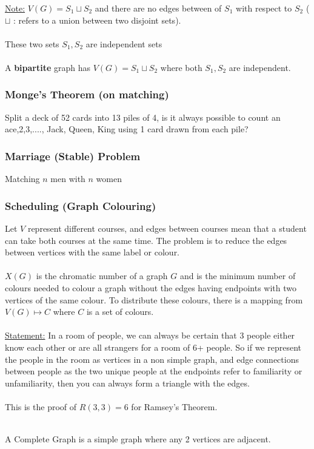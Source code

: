 \documentclass[12pt]{article}
\begin{document}
\underline{Note:} $V(G) = S_1 \sqcup S_2$ and there are no edges between of $S_1$ with respect to $S_2$ ($\sqcup$ : refers to a union between two disjoint sets).\\
\\
These two sets $S_1, S_2$ are independent sets\\
\\
A \textbf{bipartite} graph has $V(G) = S_1 \sqcup S_2$ where both $S_1, S_2$ are independent.

\subsubsection{Monge's Theorem (on matching)}

Split a deck of 52 cards into 13 piles of 4, is it always possible to count an ace,2,3,...., Jack, Queen, King using 1 card drawn from each pile?

\subsubsection{Marriage (Stable) Problem}

Matching $n$ men with $n$ women

\subsubsection{Scheduling (Graph Colouring)}

Let $V$ represent different courses, and edges between courses mean that a student can take both courses at the same time. The problem is to reduce the edges between vertices with the same label or colour.\\
\\
$X(G)$ is the chromatic number of a graph $G$ and is the minimum number of colours needed to colour a graph without the edges having endpoints with two vertices of the same colour. To distribute these colours, there is a mapping from $V(G) \mapsto C$ where $C$ is a set of colours.\\
\\
\underline{Statement:} In a room of people, we can always be certain that 3 people either know each other or are all strangers for a room of 6+ people. So if we represent the people in the room as vertices in a non simple graph, and edge connections between people as the two unique people at the endpoints refer to familiarity or unfamiliarity, then you can always form a triangle with the edges.\\
\\
This is the proof of $R(3,3)=6$ for Ramsey's Theorem.\\
\\
\begin{tcolorbox}[title=Definition: Complete Graph]
	A Complete Graph is a simple graph where any 2 vertices are adjacent.
\end{tcolorbox}
\end{document}
